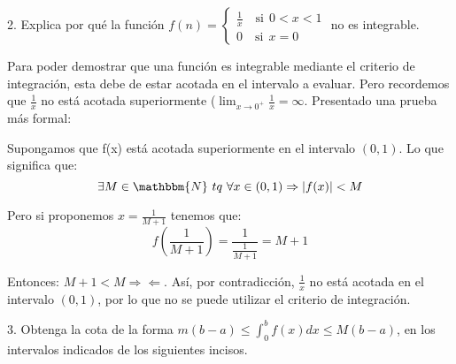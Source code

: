 \documentclass[12pt]{article}
\begin{document}
2. Explica por qu\'e la funci\'on
\(f(n)=
\begin{cases}
    \displaystyle\frac{1}{x} \quad \text{si} \ \ 0<x<1\\
    0 \quad \text{si} \ \ x=0
\end{cases}
\) no es integrable.\bigskip

    Para poder demostrar que una funci\'on es integrable mediante el criterio de integraci\'on, esta debe de estar acotada en el intervalo a evaluar. Pero recordemos que \(\frac{1}{x}\) no est\'a acotada superiormente (\(\lim_{x\to0^+}\frac{1}{x}=\infty\). Presentado una prueba m\'as formal:\medskip

    Supongamos que f(x) est\'a acotada superiormente en el intervalo \((0,1)\). Lo que significa que:
    \[\exists M\in\mathbbm{N} \ tq \ \forall x\in(0,1) \Rightarrow \left|f(x)\right|<M\]

    Pero si proponemos \(\displaystyle x=\frac{1}{M+1}\) tenemos que:
    \[f\left(\frac{1}{M+1}\right)=\frac{1}{\frac{1}{M+1}}=M+1\]

    Entonces: \(\displaystyle M+1<M \Rightarrow\!\Leftarrow\). As\'i, por contradicci\'on, \(\displaystyle\frac{1}{x}\) no est\'a acotada en el intervalo \((0,1)\), por lo que no se puede utilizar el criterio de integraci\'on.\medskip

3. Obtenga la cota de la forma \(m(b-a) \leq \displaystyle\int_{0}^{b}f(x)dx \leq M(b-a)\), en los intervalos indicados de los siguientes incisos.
\end{document}
